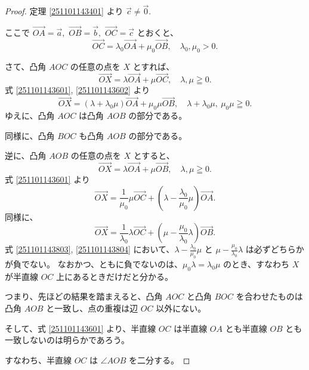 \begin{proof}
  定理 \ref{251101143401} より \(\vec{c}\neq\vec{0}.\)

  ここで \(\overrightarrow{OA}=\vec{a},\) \(\overrightarrow{OB}=\vec{b},\) \(\overrightarrow{OC}=\vec{c}\) とおくと、
  \begin{equation}\label{251101143601}
    \overrightarrow{OC}=\lambda_0\overrightarrow{OA}+\mu_0\overrightarrow{OB},\quad \lambda_0,\mu_0>0.
  \end{equation}

  さて、凸角 \(AOC\) の任意の点を \(X\) とすれば、
  \begin{equation}\label{251101143602}
    \overrightarrow{OX}=\lambda\overrightarrow{OA}+\mu\overrightarrow{OC},\quad \lambda,\mu\geqq0.
  \end{equation}
  式 \eqref{251101143601}, \eqref{251101143602} より
  \[\overrightarrow{OX}=(\lambda+\lambda_0\mu)\overrightarrow{OA}+\mu_0\mu\overrightarrow{OB},\quad \lambda+\lambda_0\mu,\:\mu_0\mu\geqq0.\]
  ゆえに、凸角 \(AOC\) は凸角 \(AOB\) の部分である。

  同様に、凸角 \(BOC\) も凸角 \(AOB\) の部分である。

  逆に、凸角 \(AOB\) の任意の点を \(X\) とすると、
  \[\overrightarrow{OX}=\lambda\overrightarrow{OA}+\mu\overrightarrow{OB},\quad \lambda,\mu\geqq0.\]
  式 \eqref{251101143601} より
  \begin{equation}\label{251101143803}
    \overrightarrow{OX}=\frac{1}{\mu_0}\mu\overrightarrow{OC}+(\lambda-\frac{\lambda_0}{\mu_0}\mu)\overrightarrow{OA}.
  \end{equation}
  同様に、
  \begin{equation}\label{251101143804}
    \overrightarrow{OX}=\frac{1}{\lambda_0}\lambda\overrightarrow{OC}+(\mu-\frac{\mu_0}{\lambda_0}\lambda)\overrightarrow{OB}.
  \end{equation}
  式 \eqref{251101143803}, \eqref{251101143804} において、\(\displaystyle \lambda-\frac{\lambda_0}{\mu_0}\mu\) と \(\displaystyle \mu-\frac{\mu_0}{\lambda_0}\lambda\) は必ずどちらかが負でない。
  なおかつ、ともに負でないのは、\(\mu_0\lambda=\lambda_0\mu\) のとき、すなわち \(X\) が半直線 \(OC\) 上にあるときだけだと分かる。

  つまり、先ほどの結果を踏まえると、凸角 \(AOC\) と凸角 \(BOC\) を合わせたものは凸角 \(AOB\) と一致し、点の重複は辺 \(OC\) 以外にない。

  そして、式 \eqref{251101143601} より、半直線 \(OC\) は半直線 \(OA\) とも半直線 \(OB\) とも一致しないのは明らかであろう。

  すなわち、半直線 \(OC\) は \(\angle AOB\) を二分する。
\end{proof}
